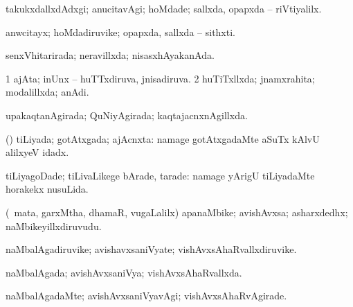 {\bentry
{} 
\gl{\kirxvi}
\expl{}
\bmng
takukxdallxdAdxgi; anucitavAgi; hoMdade; sallxda, opapxda -- riVtiyalilx. 
\emng
\eentry

\bentry
{} 
\gl{\nA}
\expl{}
\bmng
anwcitayx; hoMdadiruvike; opapxda, sallxda -- sithxti. 
\emng
\eentry

\bentry
{} 
\gl{\gu}
\expl{}
\bmng
senxVhitarirada; neravillxda; nisasxhAyakanAda. 
\emng
\eentry

\bentry
{} 
\gl{\gu}
\expl{}
\bmng
\bnum
\num{1} ajAta; inUnx -- huTTxdiruva, jnisadiruva. 
\num{2} huTiTxllxda; jnamxrahita; modalillxda; anAdi. 
\enum
\emng
\eentry

\bentry
{} 
\gl{\gu}
\expl{}
\bmng
upakaqtanAgirada; QuNiyAgirada; kaqtajacnxnAgillxda. 
\emng
\eentry

\bentry
{} 
\gl{\gu}
\expl{}
\bmng
(\AmA) tiLiyada; gotAtxgada; ajAcnxta:  namage gotAtxgadaMte aSuTx kAlvU alilxyeV idadx. 
\emng

\noindent
\gl{\pagu}
\expl{}
\bmng
{} tiLiyagoDade; tiLivaLikege bArade, tarade:  namage yArigU tiLiyadaMte horakekx nusuLida. 
\emng
\eentry

\bentry
{} 
\gl{\gu}
\expl{}
\bmng
{} 
\emng
\eentry

\bentry
{} 
\gl{\nA}
\expl{}
\bmng
(\kanmu\ mata, garxMtha, dhamaR, \mo vugaLalilx) apanaMbike; avishAvxsa; asharxdedhx; naMbikeyillxdiruvudu. 
\emng
\eentry

\bentry
{} 
\gl{\nA}
\expl{}
\bmng
naMbalAgadiruvike; avishavxsaniVyate; vishAvxsAhaRvallxdiruvike. 
\emng
\eentry

\bentry
{} 
\gl{\gu}
\expl{}
\bmng
naMbalAgada; avishAvxsaniVya; vishAvxsAhaRvallxda. 
\emng
\eentry

\bentry
{} 
\gl{\nA}
\expl{}
\bmng
{} 
\emng
\eentry

\bentry
{} 
\gl{\kirxvi}
\expl{}
\bmng
naMbalAgadaMte; avishAvxsaniVyavAgi; vishAvxsAhaRvAgirade. 
\emng
\eentry

}
